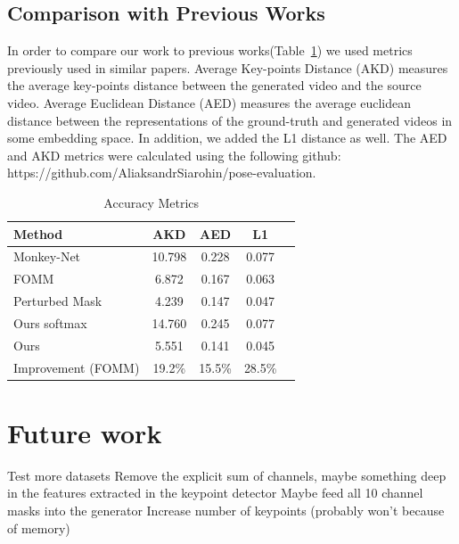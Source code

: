 \documentclass{article}
\begin{document}
\subsection{Comparison with Previous Works}
In order to compare our work to previous works(Table~\ref{table:results}) we used metrics previously used in similar papers. Average Key-points Distance \cite{cao2017realtime} (AKD) measures the average key-points distance between the generated video and the source video. Average Euclidean Distance \cite{zheng2019joint}  (AED) measures the average euclidean distance
 between the representations of the ground-truth and generated videos in some embedding space. In addition, we added the L1 distance as well. The AED and AKD metrics were calculated using the following github: https://github.com/AliaksandrSiarohin/pose-evaluation.



\begin{table}[t]
\caption{Accuracy Metrics}
\label{table:results}
\vskip 0.15in
\begin{center}
\begin{small}
\begin{sc}
\begin{tabular}{lcccr}
\toprule
Method & AKD & AED & L1 \\
\midrule
Monkey-Net    & 10.798 & 0.228 & 0.077 \\
FOMM    & 6.872 & 0.167 & 0.063 \\
Perturbed Mask & 4.239 & 0.147 & 0.047 \\
Ours softmax & 14.760& 0.245 & 0.077 \\
Ours & 5.551 & 0.141 &  0.045\\
\midrule
Improvement (FOMM)    & 19.2\% & 15.5\% & 28.5\% \\
\bottomrule
\end{tabular}
\end{sc}
\end{small}
\end{center}
\vskip -0.1in
\end{table}
\section{Future work}
Test more datasets
Remove the explicit sum of channels, maybe something deep in the features
extracted in the keypoint detector
Maybe feed all 10 channel masks into the generator
Increase number of keypoints (probably won't because of memory)
\end{document}
